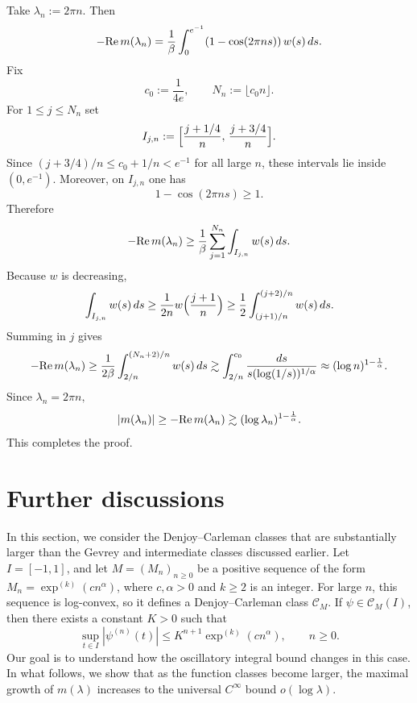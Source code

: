 \documentclass[11pt]{amsart}
\newcommand{\la}{\lambda}
\renewcommand{\Re}{ {\rm Re}\,}
\newcommand{\1}{{\rm 1\hspace*{-0.4ex}%
			\rule{0.1ex}{1.52ex}\hspace*{0.2ex}}}
\numberwithin{equation}{section}
\begin{document}
Take $\lambda_n:=2\pi n.$
Then
\[
-\Re m(\lambda_n)
=
\frac1\beta \int_0^{e^{-1}} (1-\cos(2\pi n s))\,w(s)\,ds.
\]
Fix
\[
c_0:=\frac1{4e},
\qquad
N_n:=\lfloor c_0 n\rfloor.
\]
For $1\le j\le N_n$ set
\[
I_{j,n}:=\Bigl[\frac{j+1/4}{n},\,\frac{j+3/4}{n}\Bigr].
\]
Since $(j+3/4)/n\le c_0+1/n<e^{-1}$ for all large $n$, these intervals lie inside $(0,e^{-1})$.
Moreover, on $I_{j,n}$ one has
\[
1-\cos(2\pi n s)\ge 1.
\]
Therefore
\[
-\Re m(\lambda_n)\ge \frac1\beta \sum_{j=1}^{N_n}\int_{I_{j,n}} w(s)\,ds.
\]
Because $w$ is decreasing,
\[
\int_{I_{j,n}} w(s)\,ds
\ge
\frac{1}{2n}w\Bigl(\frac{j+1}{n}\Bigr)
\ge
\frac12\int_{(j+1)/n}^{(j+2)/n} w(s)\,ds.
\]
Summing in $j$ gives
\[
-\Re m(\lambda_n)
\ge
\frac{1}{2\beta}\int_{2/n}^{(N_n+2)/n} w(s)\,ds
\gtrsim
\int_{2/n}^{c_0} \frac{ds}{s(\log(1/s))^{1/\alpha}}\approx
(\log n)^{1-\frac1\alpha}.
\]
Since $\lambda_n=2\pi n,$
\[
|m(\lambda_n)|\ge -\Re m(\lambda_n)\gtrsim (\log \la_n)^{1-\frac1\alpha}.
\]
This completes the proof.


\section{Further discussions}\label{sec8}
In this section, we consider the Denjoy--Carleman classes that are substantially larger than the Gevrey and intermediate classes discussed earlier. Let $I=[-1,1]$, and let $M=(M_n)_{n\ge0}$ be a positive sequence of the form $M_n=\exp^{(k)}(c n^\alpha)$, where $c,\alpha>0$ and $k\ge2$ is an integer. For large $n$, this sequence is log-convex, so it defines a Denjoy--Carleman class $\mathcal C_M$. If $\psi\in\mathcal C_M(I)$, then there exists a constant $K>0$ such that
\begin{equation}\label{defdc2}
    \sup_{t\in I} |\psi^{(n)}(t)|
    \le K^{n+1}\exp^{(k)}(c n^\alpha),
    \qquad n\ge0.
\end{equation}
Our goal is to understand how the oscillatory integral bound changes in this case. 
In what follows, we show that as the function classes become larger, the maximal growth of $m(\la)$ increases to the universal $C^\infty$ bound $o(\log\la)$.
\end{document}
